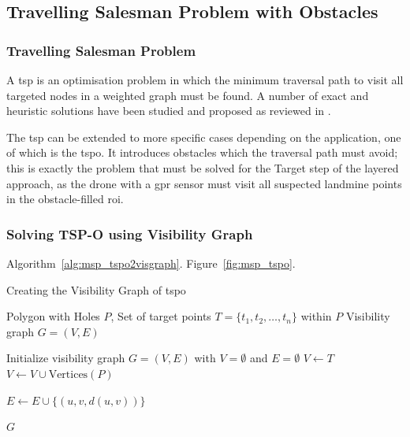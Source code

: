 \subsection{Travelling Salesman Problem with Obstacles}
\label{sec:msp_tspo}

\subsubsection{Travelling Salesman Problem}

A \gls{tsp} is an optimisation problem in which the minimum traversal path to visit all targeted nodes in a weighted graph must be found. A number of exact and heuristic solutions have been studied and proposed as reviewed in \cite{laporte1992tsp}. 


The \gls{tsp} can be extended to more specific cases depending on the application, one of which is the \gls{tspo}. It introduces obstacles which the traversal path must avoid; this is exactly the problem that must be solved for the Target step of the layered approach, as the drone with a \gls{gpr} sensor must visit all suspected landmine points in the obstacle-filled \gls{roi}.


\subsubsection{Solving TSP-O using Visibility Graph}



Algorithm~\ref{alg:msp_tspo2visgraph}. Figure~\ref{fig:msp_tspo}.

\begin{algorithm}
\caption{Creating the Visibility Graph of \gls{tspo}}
\label{alg:msp_tspo2visgraph}
\begin{algorithmic}[1]
\Require Polygon with Holes $P$, Set of target points $T = \{t_1, t_2, \ldots, t_n\}$ within $P$
\Ensure Visibility graph $G = (V, E)$

\State Initialize visibility graph $G = (V, E)$ with $V = \emptyset$ and $E = \emptyset$
\State $V \leftarrow T$ 
\State $V \leftarrow V \cup \text{Vertices}(P)$ 

            \State $E \leftarrow E \cup \{(u, v, d(u, v))\}$ 
        \EndIf
    \EndFor
\EndFor

\Return $G$ 
\end{algorithmic}
\end{algorithm}

